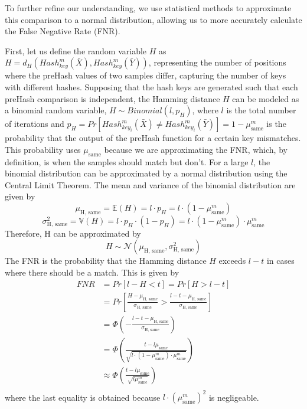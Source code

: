 To further refine our understanding, we use statistical methods to approximate this comparison to a normal distribution, allowing us to more accurately calculate the False Negative Rate (FNR). 

First, let us define the random variable $H$ as \(H = d_H(Hash_{key}^m(\bar{X}), Hash_{key}^m(\bar{Y}))\), representing the number of positions where the preHash values of two samples differ, capturing the number of keys with different hashes. Supposing that the hash keys are generated such that each preHash comparison is independent, the Hamming distance $H$ can be modeled as a binomial random variable, \(H \sim Binomial(l, p_H)\), where $l$ is the total number of iterations and $p_H = Pr[Hash_{key_i}^m(\bar{X}) \neq Hash_{key_i}^m(\bar{Y})] = 1 - \mu_{\text{same}}^m$ is the probability that the output of the preHash function for a certain key mismatches. This probability uses $\mu_{\text{same}}$ because we are approximating the FNR, which, by definition, is when the samples should match but don't. 
\newline For a large $l$, the binomial distribution can be approximated by a normal distribution using the Central Limit Theorem. The mean and variance of the binomial distribution are given by
\[
\mu_{\text{H, same}} = \mathbb{E}(H) = l \cdot p_H = l \cdot (1 - \mu_{\text{same}}^m)    
\]
\[
\sigma_{\text{H, same}}^2 = \mathbb{V}(H) = l \cdot p_H \cdot (1 - p_H) = l \cdot (1 - \mu_{\text{same}}^m) \cdot \mu_{\text{same}}^m    
\]
Therefore, H can be approximated by
\[
H \sim \mathcal{N}(\mu_{\text{H, same}}, \sigma_{\text{H, same}}^2)    
\]
The FNR is the probability that the Hamming distance $H$ exceeds $l - t$ in cases where there should be a match. This is given by
\begin{equation}
    \begin{aligned}
        \label{eq:fnr}
        FNR &= Pr[l - H < t] = Pr[H > l - t] \\
        &= Pr\left[\frac{H - \mu_{\text{H, same}}}{\sigma_{\text{H, same}}} > \frac{l - t - \mu_{\text{H, same}}}{\sigma_{\text{H, same}}}\right] \\
        &= \Phi \left( - \frac{l - t - \mu_{\text{H, same}}}{\sigma_{\text{H, same}}}\right) \\
        &= \Phi \left(\frac{t - l\mu_{\text{same}}}{\sqrt{l \cdot (1 - \mu_{\text{same}}^m) \cdot \mu_{\text{same}}^m}}\right) \\
        &\approx \Phi \left(\frac{t - l\mu_{\text{same}}}{\sqrt{l\mu_{\text{same}}^m}}\right) \\
    \end{aligned}        
\end{equation}
where the last equality is obtained because $l\cdot(\mu_{\text{same}}^m)^2$ is negligeable. 

